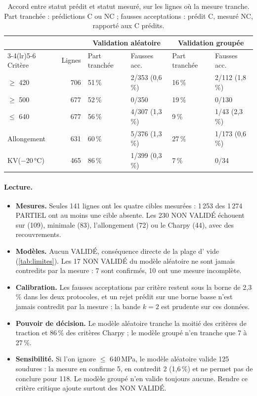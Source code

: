 \begin{table}[htbp]
\centering
\small
\caption{Accord entre statut prédit et statut mesuré, sur les lignes où la
mesure tranche. Part tranchée : prédictions C ou NC ; fausses acceptations :
prédit C, mesuré NC, rapporté aux C prédits.}
\label{tab:val_accord}
\begin{tabular}{@{}l r ll ll@{}}
\toprule
 & & \multicolumn{2}{c}{Validation aléatoire} & \multicolumn{2}{c}{Validation groupée} \\
\cmidrule(lr){3-4}\cmidrule(lr){5-6}
Critère & Lignes & Part tranchée & Fausses acc. & Part tranchée & Fausses acc. \\
\midrule
\YS{} $\geq$ 420     & 706 & 51\,\% & 2/353 (0,6\,\%) & 16\,\% & 2/112 (1,8\,\%) \\
\UTS{} $\geq$ 500    & 677 & 52\,\% & 0/350           & 19\,\% & 0/130 \\
\UTS{} $\leq$ 640    & 677 & 56\,\% & 4/307 (1,3\,\%) & 9\,\%  & 1/43 (2,3\,\%) \\
Allongement          & 631 & 60\,\% & 5/376 (1,3\,\%) & 27\,\% & 1/173 (0,6\,\%) \\
KV($-20$\,°C)        & 465 & 86\,\% & 1/399 (0,3\,\%) & 7\,\%  & 0/34 \\
\bottomrule
\end{tabular}
\end{table}

\paragraph{Lecture.}
\begin{itemize}
  \item \textbf{Mesures.} Seules 141 lignes ont les quatre cibles mesurées : 1\,253 des 1\,274 PARTIEL ont au moins une cible absente. Les 230 NON VALIDÉ échouent sur \YS{} (109), \UTS{} minimale (83), l'allongement (72) ou le Charpy (44), avec des recouvrements.
  \item \textbf{Modèles.} Aucun VALIDÉ, conséquence directe de la plage d'\UTS{} vide (\cref{tab:limites}). Les 17 NON VALIDÉ du modèle aléatoire ne sont jamais contredits par la mesure : 7 sont confirmés, 10 ont une mesure incomplète.
  \item \textbf{Calibration.} Les fausses acceptations par critère restent sous la borne de 2,3\,\% dans les deux protocoles, et un rejet prédit sur une borne basse n'est jamais contredit par la mesure : la bande $k = 2$ est prudente sur ces données.
  \item \textbf{Pouvoir de décision.} Le modèle aléatoire tranche la moitié des critères de traction et 86\,\% des critères Charpy ; le modèle groupé n'en tranche que 7 à 27\,\%.
  \item \textbf{Sensibilité.} Si l'on ignore \UTS{} $\leq$ 640\,MPa, le modèle aléatoire valide 125 soudures : la mesure en confirme 5, en contredit 2 (1,6\,\%) et ne permet pas de conclure pour 118. Le modèle groupé n'en valide toujours aucune. Rendre ce critère critique ajoute surtout des NON VALIDÉ.
\end{itemize}

